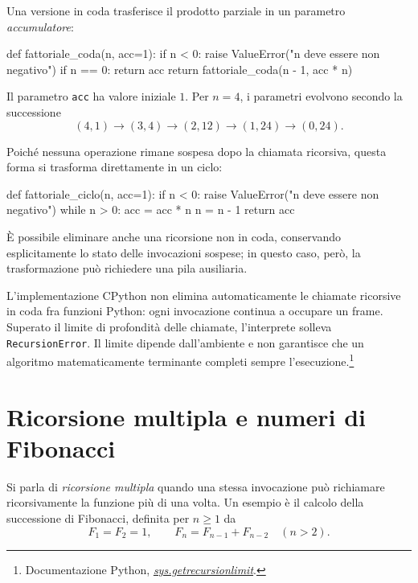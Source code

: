 Una versione in coda trasferisce il prodotto parziale in un parametro
\emph{accumulatore}:

\begin{unipdcode}[language=Python]
def fattoriale_coda(n, acc=1):
    if n < 0:
        raise ValueError("n deve essere non negativo")
    if n == 0:
        return acc
    return fattoriale_coda(n - 1, acc * n)
\end{unipdcode}

Il parametro \texttt{acc} ha valore iniziale \(1\). Per \(n=4\),
i parametri evolvono secondo la successione
\[
  (4,1)\longrightarrow(3,4)\longrightarrow(2,12)
  \longrightarrow(1,24)\longrightarrow(0,24).
\]

Poiché nessuna operazione rimane sospesa dopo la chiamata ricorsiva,
questa forma si trasforma direttamente in un ciclo:

\begin{unipdcode}[language=Python]
def fattoriale_ciclo(n, acc=1):
    if n < 0:
        raise ValueError("n deve essere non negativo")
    while n > 0:
        acc = acc * n
        n = n - 1
    return acc
\end{unipdcode}

È possibile eliminare anche una ricorsione non in coda, conservando
esplicitamente lo stato delle invocazioni sospese; in questo caso, però,
la trasformazione può richiedere una pila ausiliaria.

L'implementazione CPython non elimina automaticamente le chiamate
ricorsive in coda fra funzioni Python: ogni invocazione continua a
occupare un frame. Superato il limite di profondità delle chiamate,
l'interprete solleva \texttt{RecursionError}. Il limite dipende
dall'ambiente e non garantisce che un algoritmo matematicamente
terminante completi sempre l'esecuzione.\footnote{Documentazione Python,
\href{https://docs.python.org/3/library/sys.html\#sys.getrecursionlimit}
{\emph{sys.getrecursionlimit}}.}

\section{Ricorsione multipla e numeri di Fibonacci}
\label{sec:fi-fibonacci}

Si parla di \emph{ricorsione multipla} quando una stessa invocazione
può richiamare ricorsivamente la funzione più di una volta. Un esempio
è il calcolo della successione di Fibonacci, definita per \(n\ge1\) da
\begin{equation}
  F_1=F_2=1,\qquad
  F_n=F_{n-1}+F_{n-2}\quad(n>2).
  \label{eq:fi-fibonacci}
\end{equation}

